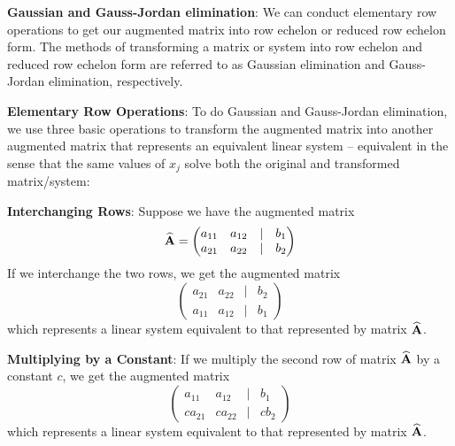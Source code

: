 \documentclass[]{book}
\theoremstyle{definition}
\theoremstyle{definition}
\theoremstyle{definition}
\theoremstyle{remark}
\begin{document}
\textbf{Gaussian and Gauss-Jordan elimination}: We can conduct elementary row operations to get our augmented matrix into row echelon or reduced row echelon form. The methods of transforming a matrix or system into row echelon and reduced row echelon form are referred to as Gaussian elimination and Gauss-Jordan elimination, respectively.

\textbf{Elementary Row Operations}: To do Gaussian and Gauss-Jordan elimination, we use three basic operations to transform the augmented matrix into another augmented matrix that represents an equivalent linear system -- equivalent in the sense that the same values of \(x_j\) solve both the original and transformed matrix/system:

\textbf{Interchanging Rows}: Suppose we have the augmented matrix
\[{\widehat{\bf A}}=\begin{pmatrix} a_{11} & a_{12} & | & b_1\\
            a_{21} & a_{22} & | & b_2 
            \end{pmatrix}\]
If we interchange the two rows, we get the augmented matrix
\[\begin{pmatrix}
            a_{21} & a_{22} & | & b_2\\
            a_{11} & a_{12} & | & b_1
            \end{pmatrix}\]
which represents a linear system equivalent to that represented by matrix \(\widehat{\bf A}\).

\textbf{Multiplying by a Constant}: If we multiply the second row of matrix \(\widehat{\bf A}\) by a constant \(c\), we get the augmented matrix
\[\begin{pmatrix}
            a_{11} & a_{12} & | & b_1\\
            c a_{21} & c a_{22} & | & c b_2
            \end{pmatrix}\]
which represents a linear system equivalent to that represented by matrix \(\widehat{\bf A}\).
\end{document}
